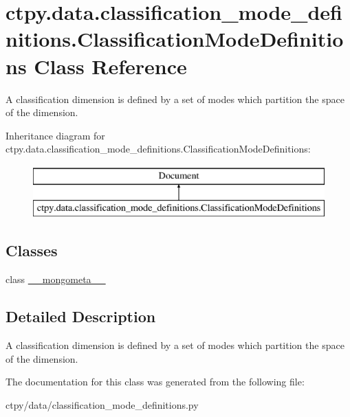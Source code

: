 \hypertarget{classctpy_1_1data_1_1classification__mode__definitions_1_1_classification_mode_definitions}{\section{ctpy.\-data.\-classification\-\_\-mode\-\_\-definitions.\-Classification\-Mode\-Definitions Class Reference}
\label{classctpy_1_1data_1_1classification__mode__definitions_1_1_classification_mode_definitions}
}


A classification dimension is defined by a set of modes which partition the space of the dimension.  


Inheritance diagram for ctpy.\-data.\-classification\-\_\-mode\-\_\-definitions.\-Classification\-Mode\-Definitions\-:\begin{figure}[H]
\begin{center}
\leavevmode
\includegraphics[height=2.000000cm]{classctpy_1_1data_1_1classification__mode__definitions_1_1_classification_mode_definitions}
\end{center}
\end{figure}
\subsection*{Classes}
\begin{DoxyCompactItemize}
\item 
class \hyperlink{classctpy_1_1data_1_1classification__mode__definitions_1_1_classification_mode_definitions_1_1____mongometa____}{\-\_\-\-\_\-mongometa\-\_\-\-\_\-}
\end{DoxyCompactItemize}


\subsection{Detailed Description}
A classification dimension is defined by a set of modes which partition the space of the dimension. 

The documentation for this class was generated from the following file\-:\begin{DoxyCompactItemize}
\item 
ctpy/data/classification\-\_\-mode\-\_\-definitions.\-py\end{DoxyCompactItemize}
